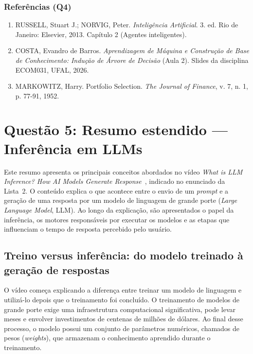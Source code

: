 \documentclass[12pt, a4paper]{article}
\providecommand{\tightlist}{%
  \setlength{\itemsep}{0pt}\setlength{\parskip}{0pt}}
\begin{document}
\subsubsection{Referências (Q4)}\label{referuxeancias-q4}

\begin{enumerate}
\def\labelenumi{\arabic{enumi}.}
\tightlist
\item
  RUSSELL, Stuart J.; NORVIG, Peter. \emph{Inteligência Artificial}. 3. ed. Rio de Janeiro: Elsevier, 2013. Capítulo 2 (Agentes inteligentes).
\item
  COSTA, Evandro de Barros. \emph{Aprendizagem de Máquina e Construção de Base de Conhecimento: Indução de Árvore de Decisão} (Aula 2). Slides da disciplina ECOM031, UFAL, 2026.
\item
  MARKOWITZ, Harry. Portfolio Selection. \emph{The Journal of Finance}, v. 7, n. 1, p. 77-91, 1952.
\end{enumerate}

\newpage
\section{Questão 5: Resumo estendido --- Inferência em LLMs}
\label{sec:q5}

Este resumo apresenta os principais conceitos abordados no vídeo \emph{What is LLM Inference? How AI Models Generate Response}~\cite{ibm_llm_inference}, indicado no enunciado da Lista~2. O conteúdo explica o que acontece entre o envio de um \textit{prompt} e a geração de uma resposta por um modelo de linguagem de grande porte (\textit{Large Language Model}, LLM). Ao longo da explicação, são apresentados o papel da inferência, os motores responsáveis por executar os modelos e as etapas que influenciam o tempo de resposta percebido pelo usuário.

\subsection{Treino versus inferência: do modelo treinado à geração de respostas}

O vídeo começa explicando a diferença entre treinar um modelo de linguagem e utilizá-lo depois que o treinamento foi concluído. O treinamento de modelos de grande porte exige uma infraestrutura computacional significativa, pode levar meses e envolver investimentos de centenas de milhões de dólares. Ao final desse processo, o modelo possui um conjunto de parâmetros numéricos, chamados de pesos (\textit{weights}), que armazenam o conhecimento aprendido durante o treinamento.
\end{document}

